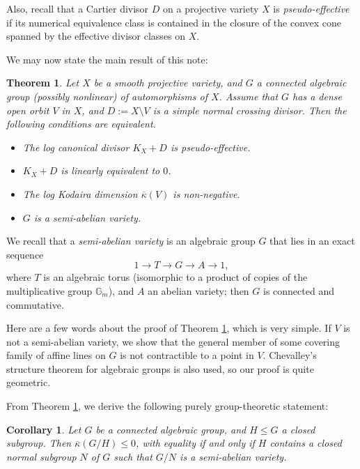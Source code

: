 \documentclass[12pt,a4paper]{amsart}
\theoremstyle{plain}
\newtheorem{corollary}[thm]{Corollary}
\newtheorem{theorem}[thm]{Theorem}
\theoremstyle{definition}
\theoremstyle{remark}
\begin{document}
Also, recall that a Cartier divisor $D$ on a projective variety $X$
is {\it pseudo-effective} if its numerical equivalence class is contained
in the closure of the convex cone spanned by the effective divisor
classes on $X$.

We may now state the main result of this note:

\begin{theorem}\label{ThA}
Let $X$ be a smooth projective variety, and $G$ a connected algebraic
group (possibly nonlinear) of automorphisms of $X$. Assume that
$G$ has a dense open orbit $V$ in $X$, and $D := X \setminus V$
is a simple normal crossing divisor.
Then the following conditions are equivalent.
\begin{itemize}
\item[(1)] The log canonical divisor $K_X + D$ is pseudo-effective.
\item[(2)] $K_X + D$ is linearly equivalent to $0$.
\item[(3)] The log Kodaira dimension $\overline{\kappa}(V)$ is non-negative.
\item[(4)] $G$ is a semi-abelian variety.
\end{itemize}
\end{theorem}

We recall that a {\it semi-abelian variety} is an algebraic group $G$
that lies in an exact sequence
\[ 1 \longrightarrow T \longrightarrow G \longrightarrow A \longrightarrow 1, \]
where $T$ is an algebraic torus (isomorphic to a product of copies
of the multiplicative group ${\mathbb{G}}_m$), and $A$ an abelian variety;
then $G$ is connected and commutative.

Here are a few words about the proof of Theorem \ref{ThA}, which is very simple.
If $V$ is not a semi-abelian variety, we show that the general member of some
covering family of affine lines on $G$ is not contractible to a point in $V$.
Chevalley's structure theorem for algebraic groups is also used, so our proof
is quite geometric.

From Theorem \ref{ThA}, we derive the following purely group-theoretic
statement:

\begin{corollary}\label{CorA}
Let $G$ be a connected algebraic group, and $H \le G$ a closed subgroup.
Then $\overline{\kappa}(G/H) \le 0$, with equality if and only if $H$ contains
a closed normal subgroup $N$ of $G$ such that $G/N$ is a semi-abelian variety.
\end{corollary}
\end{document}
